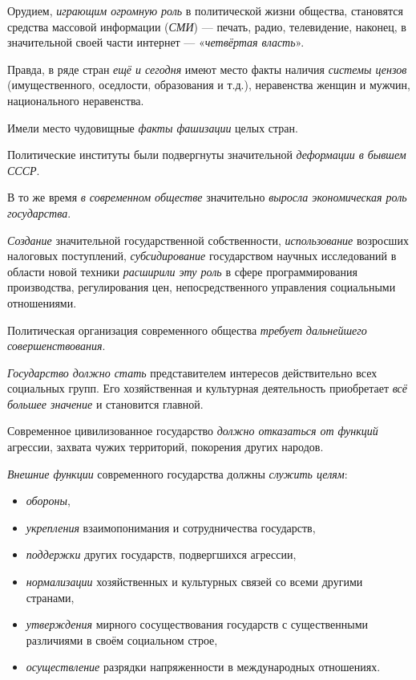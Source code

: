 \documentclass[a4paper,14pt,russian]{extreport}
\begin{document}
Орудием, \emph{играющим огромную роль} в политической жизни общества, становятся средства массовой информации (\emph{СМИ}) --- печать, радио, телевидение, наконец, в значительной своей части интернет --- «\emph{четвёртая власть}».

Правда, в ряде стран \emph{ещё и сегодня} имеют место факты наличия \emph{системы цензов} (имущественного, оседлости, образования и т.д.), неравенства женщин и мужчин, национального неравенства.

Имели место чудовищные \emph{факты фашизации} целых стран.

Политические институты были подвергнуты значительной \emph{деформации в бывшем СССР}.

В то же время \emph{в современном обществе} значительно \emph{выросла экономическая роль государства}.

\emph{Создание} значительной государственной собственности, \emph{использование} возросших налоговых поступлений, \emph{субсидирование} государством научных исследований в области новой техники \emph{расширили эту роль} в сфере программирования производства, регулирования цен, непосредственного управления социальными отношениями.

Политическая организация современного общества \emph{требует} \emph{дальнейшего совершенствования}.

\emph{Государство должно стать} представителем интересов действительно всех социальных групп. Его хозяйственная и культурная деятельность приобретает \emph{всё большее значение} и становится главной.

Современное цивилизованное государство \emph{должно отказаться от функций} агрессии, захвата чужих территорий, покорения других народов.

\emph{Внешние функции} современного государства должны \emph{служить целям}:

\begin{itemize}
\item \emph{обороны},
\item \emph{укрепления} взаимопонимания и сотрудничества государств,
\item \emph{поддержки} других государств, подвергшихся агрессии,
\item \emph{нормализации} хозяйственных и культурных связей со всеми другими странами,
\item \emph{утверждения} мирного сосуществования государств с существенными различиями в своём социальном строе,
\item \emph{осуществление} разрядки напряженности в международных отношениях.
\end{itemize}
\end{document}

